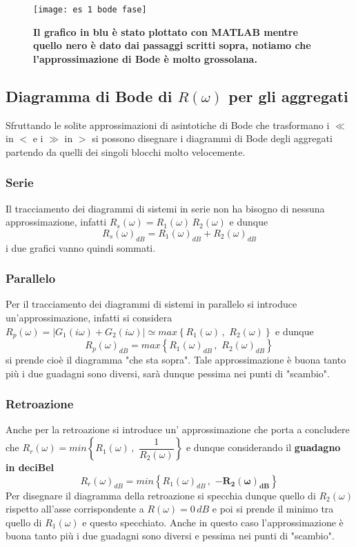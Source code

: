 \documentclass[a4paper]{article}
\begin{document}
	\begin{figure}[H]
		\centering
		\texttt{[image: es 1 bode fase]}
		\caption{\textbf{Il grafico in blu è stato plottato con MATLAB mentre quello nero è dato dai passaggi scritti sopra, notiamo che l'approssimazione di Bode è molto grossolana.}}
	\end{figure}

	\subsection{Diagramma di Bode di $R(\omega)$ per gli aggregati}
	Sfruttando le solite approssimazioni di asintotiche di Bode che trasformano i $\ll$ in $<$ e i $\gg$ in $>$ si possono disegnare i diagrammi di Bode degli aggregati partendo da quelli dei singoli blocchi molto velocemente.
	\subsubsection{Serie}
	Il tracciamento dei diagrammi di sistemi in serie non ha bisogno di nessuna approssimazione, infatti $R_s(\omega)=R_1(\omega)\,R_2(\omega)$ e dunque \[R_s(\omega)_{dB}=R_1(\omega)_{dB}+R_2(\omega)_{dB}\]
	i due grafici vanno quindi sommati.
	
	\subsubsection{Parallelo}
	Per il tracciamento dei diagrammi di sistemi in parallelo si introduce un'approssimazione, infatti si considera $R_p(\omega)=|G_1(i\omega)+G_2(i\omega)|\simeq max\left\{R_1(\omega)\,,\,\,R_2(\omega)\right\}$ e dunque\[R_p(\omega)_{dB}=max\left\{R_1(\omega)_{dB}\,,\,\,R_2(\omega)_{dB}\right\}\] si prende cioè il diagramma "che sta sopra". Tale approssimazione è buona tanto più i due guadagni sono diversi, sarà dunque pessima nei punti di "scambio".
	
	\subsubsection{Retroazione}
	\label{bode retroazione}
	Anche per la retroazione si introduce un' approssimazione che porta a concludere che $R_r(\omega)=min\left\{R_1(\omega)\,,\,\,\dfrac{1}{R_2(\omega)}\right\}$ e dunque considerando il \textbf{guadagno in deciBel}\[R_r(\omega)_{dB}=min\left\{R_1(\omega)_{dB}\,,\,\,\mathbf{-R_2(\omega)_{dB}}\right\}\]
 	Per disegnare il diagramma della retroazione si specchia dunque quello di $R_2(\omega)$ rispetto all'asse corrispondente a $R(\omega)=0\,dB$ e poi si prende il minimo tra quello di $R_1(\omega)$ e questo specchiato. Anche in questo caso l'approssimazione è buona tanto più i due guadagni sono diversi e pessima nei punti di "scambio".
	
\end{document}
